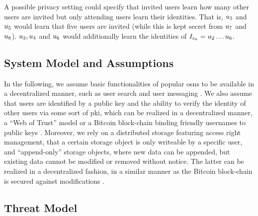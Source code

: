 A possible privacy setting
could specify that invited users learn how many other users are invited
but only attending users learn their identities. That is, $\u[3]$
and $\u[5]$ would learn that five users are invited (while this is kept
secret from $\u[7]$ and $\u[8]$). $\u[2], \u[4]$ and $\u[6]$
would additionally learn the identities of $\I = \u[2] \dots \u[6]$.

\subsection{System Model and Assumptions}
	\label{subsection:event-invitations-dosns:system-model-and-assumptions}
In the following, we
assume basic functionalities of popular \Acp{osn} to be available in 
a decentralized manner, such as user 
search \cite{GreschbachKB2013} and user messaging \cite{RowstronD2001}.
%
We also assume that users are identified by a public key and the ability  
to verify the identity of other users via some sort of \Ac{pki}, which can 
be realized in a decentralized manner, \eg a ``Web of Trust'' model or a Bitcoin 
block-chain binding friendly usernames to public keys \cite{Freitas13}. 
%
Moreover, we rely on a distributed storage
featuring access right management, \eg that a certain storage object is
only writeable by a specific user, and ``append-only'' storage objects,
where new data can be appended, but existing data cannot be modified or
removed without notice. The latter can be realized in a decentralized
fashion, \eg in a similar manner as the Bitcoin block-chain is secured
against modifications \cite{Nakamoto08}. 


\subsection{Threat Model}
	\label{subsection:event-invitations-dosns:threat-model}

